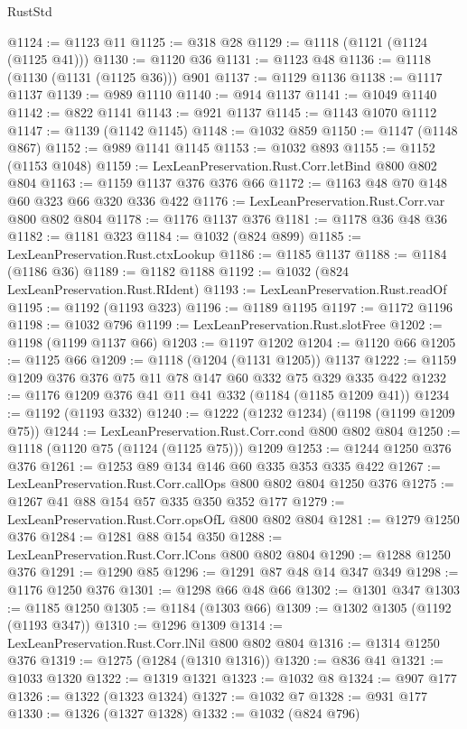 \begin{lexlean}{RustStd}
\begin{coremodule}
{\begin{coremodule}
{{{{{{{{{@1124 := @1123 @11
@1125 := @318 @28
@1129 := @1118 (@1121 (@1124 (@1125 @41)))
@1130 := @1120 @36
@1131 := @1123 @48
@1136 := @1118 (@1130 (@1131 (@1125 @36))) @901
@1137 := @1129 @1136
@1138 := @1117 @1137
@1139 := @989 @1110
@1140 := @914 @1137
@1141 := @1049 @1140
@1142 := @822 @1141
@1143 := @921 @1137
@1145 := @1143 @1070 @1112
@1147 := @1139 (@1142 @1145)
@1148 := @1032 @859
@1150 := @1147 (@1148 @867)
@1152 := @989 @1141 @1145
@1153 := @1032 @893
@1155 := @1152 (@1153 @1048)
@1159 := LexLeanPreservation.Rust.Corr.letBind @800 @802 @804
@1163 := @1159 @1137 @376 @376 @66
@1172 := @1163 @48 @70 @148 @60 @323 @66 @320 @336 @422
@1176 := LexLeanPreservation.Rust.Corr.var @800 @802 @804
@1178 := @1176 @1137 @376
@1181 := @1178 @36 @48 @36
@1182 := @1181 @323
@1184 := @1032 (@824 @899)
@1185 := LexLeanPreservation.Rust.ctxLookup
@1186 := @1185 @1137
@1188 := @1184 (@1186 @36)
@1189 := @1182 @1188
@1192 := @1032 (@824 LexLeanPreservation.Rust.RIdent)
@1193 := LexLeanPreservation.Rust.readOf
@1195 := @1192 (@1193 @323)
@1196 := @1189 @1195
@1197 := @1172 @1196
@1198 := @1032 @796
@1199 := LexLeanPreservation.Rust.slotFree
@1202 := @1198 (@1199 @1137 @66)
@1203 := @1197 @1202
@1204 := @1120 @66
@1205 := @1125 @66
@1209 := @1118 (@1204 (@1131 @1205)) @1137
@1222 := @1159 @1209 @376 @376 @75 @11 @78 @147 @60 @332 @75 @329 @335 @422
@1232 := @1176 @1209 @376 @41 @11 @41 @332 (@1184 (@1185 @1209 @41))
@1234 := @1192 (@1193 @332)
@1240 := @1222 (@1232 @1234) (@1198 (@1199 @1209 @75))
@1244 := LexLeanPreservation.Rust.Corr.cond @800 @802 @804
@1250 := @1118 (@1120 @75 (@1124 (@1125 @75))) @1209
@1253 := @1244 @1250 @376 @376
@1261 := @1253 @89 @134 @146 @60 @335 @353 @335 @422
@1267 := LexLeanPreservation.Rust.Corr.callOps @800 @802 @804 @1250 @376
@1275 := @1267 @41 @88 @154 @57 @335 @350 @352 @177
@1279 := LexLeanPreservation.Rust.Corr.opsOfL @800 @802 @804
@1281 := @1279 @1250 @376
@1284 := @1281 @88 @154 @350
@1288 := LexLeanPreservation.Rust.Corr.lCons @800 @802 @804
@1290 := @1288 @1250 @376
@1291 := @1290 @85
@1296 := @1291 @87 @48 @14 @347 @349
@1298 := @1176 @1250 @376
@1301 := @1298 @66 @48 @66
@1302 := @1301 @347
@1303 := @1185 @1250
@1305 := @1184 (@1303 @66)
@1309 := @1302 @1305 (@1192 (@1193 @347))
@1310 := @1296 @1309
@1314 := LexLeanPreservation.Rust.Corr.lNil @800 @802 @804
@1316 := @1314 @1250 @376
@1319 := @1275 (@1284 (@1310 @1316))
@1320 := @836 @41
@1321 := @1033 @1320
@1322 := @1319 @1321
@1323 := @1032 @8
@1324 := @907 @177
@1326 := @1322 (@1323 @1324)
@1327 := @1032 @7
@1328 := @931 @177
@1330 := @1326 (@1327 @1328)
@1332 := @1032 (@824 @796)
}}}}}}}}}
\end{coremodule}}
\end{coremodule}
\end{lexlean}
